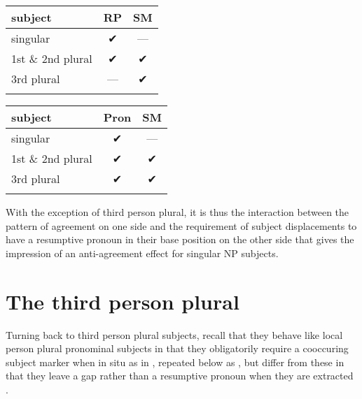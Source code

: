 \documentclass[output=paper]{langscibook}
\begin{document}
\begin{table}
  \begin{floatrow}
  \captionsetup{margin=.05\linewidth}
  {\begin{tabular}{lcc}
    \lsptoprule
    subject &RP&SM\\
    \midrule
    singular& ✔&---\\
    1st \& 2nd plural& ✔& ✔\\
    3rd plural&---& ✔\\
    \lspbottomrule
  \end{tabular}}
  {\begin{tabular}{lcc}
    \lsptoprule
    subject&Pron&SM\\
    \midrule
    singular& ✔&---\\
    1st \& 2nd plural& ✔& ✔\\
    3rd plural&  ✔& ✔\\
    \lspbottomrule
  \end{tabular}}
  \end{floatrow}
\end{table}

With the exception of third person plural, it is thus the interaction
between the pattern of agreement on one side and the requirement of
subject displacements to have a resumptive pronoun in their base
position on the other side that gives the impression of an
anti-agreement effect for singular NP subjects.



\section{The third person plural}
\label{sec:johanneshein:third-person}

Turning back to third person plural subjects, recall that they behave
like local person plural pronominal subjects in that they obligatorily
require a cooccuring subject marker when in situ as in , repeated below as , but differ from these
in that they leave a gap rather than a resumptive pronoun when they
are extracted .
\end{document}
